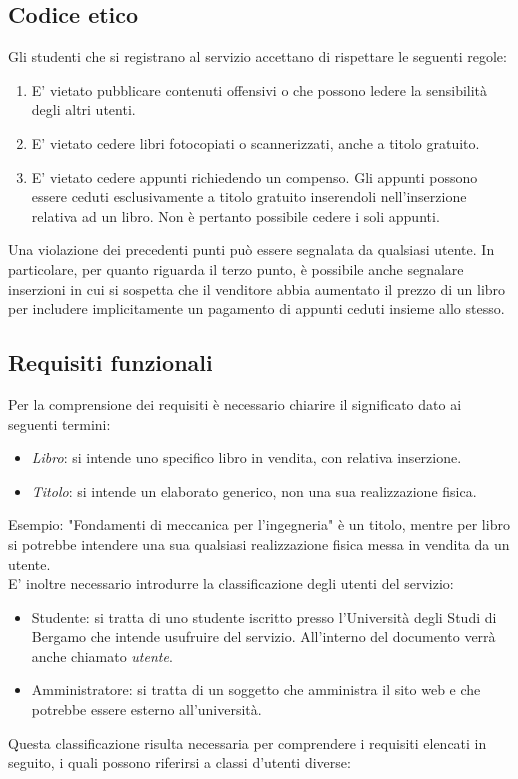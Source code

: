 \documentclass[10pt,a4paper]{report}
\begin{document}
	\subsection{Codice etico}
	Gli studenti che si registrano al servizio accettano di rispettare le seguenti regole:
	\begin{enumerate}
		\item E' vietato pubblicare contenuti offensivi o che possono ledere la sensibilità degli altri utenti.
		\item E' vietato cedere libri fotocopiati o scannerizzati, anche a titolo gratuito.
		\item E' vietato cedere appunti richiedendo un compenso. Gli appunti possono essere ceduti esclusivamente a titolo gratuito inserendoli nell'inserzione relativa ad un libro. Non è pertanto possibile cedere i soli appunti. 
	\end{enumerate}
	Una violazione dei precedenti punti può essere segnalata da qualsiasi utente. In particolare, per quanto riguarda il terzo punto, è possibile anche segnalare inserzioni in cui si sospetta che il venditore abbia aumentato il prezzo di un libro per includere implicitamente un pagamento di appunti ceduti insieme allo stesso.

	\subsection{Requisiti funzionali}
	Per la comprensione dei requisiti è necessario chiarire il significato dato ai seguenti termini:
	\begin{itemize}
		\item \textit{Libro}: si intende uno specifico libro in vendita, con relativa inserzione.
		\item \textit{Titolo}: si intende un elaborato generico, non una sua realizzazione fisica.
	\end{itemize}
	Esempio: "Fondamenti di meccanica per l'ingegneria" è un titolo, mentre per libro si potrebbe intendere una sua qualsiasi realizzazione fisica messa in vendita da un utente. \\
	E' inoltre necessario introdurre la classificazione degli utenti del servizio:
	\begin{itemize}
		\item Studente: si tratta di uno studente iscritto presso l'Università degli Studi di Bergamo che intende usufruire del servizio. All'interno del documento verrà anche chiamato \textit{utente}.
		\item Amministratore: si tratta di un soggetto che amministra il sito web e che potrebbe essere esterno all'università.
	\end{itemize}
	Questa classificazione risulta necessaria per comprendere i requisiti elencati in seguito, i quali possono riferirsi a classi d'utenti diverse:\\
	
\end{document}
